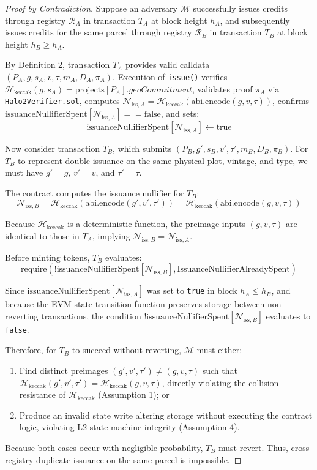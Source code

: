 \documentclass[preprint,12pt]{elsarticle}
\begin{document}
\begin{proof}[Proof by Contradiction] Suppose an adversary $\mathcal{M}$ successfully issues credits through registry $\mathcal{R}_A$ in transaction $T_A$ at block height $h_A$, and subsequently issues credits for the same parcel through registry $\mathcal{R}_B$ in transaction $T_B$ at block height $h_B \ge h_A$.

By Definition 2, transaction $T_A$ provides valid calldata $(P_A, g, s_A, v, \tau, m_A, D_A, \pi_A)$. Execution of \texttt{issue()} verifies $\mathcal{H}_{\text{keccak}}(g, s_A) = \text{projects}[P_A].geoCommitment$, validates proof $\pi_A$ via \texttt{Halo2Verifier.sol}, computes $\mathcal{N}_{\text{iss}, A} = \mathcal{H}_{\text{keccak}}(\text{abi.encode}(g, v, \tau))$, confirms $\text{issuanceNullifierSpent}[\mathcal{N}_{\text{iss}, A}] == \text{false}$, and sets:
$$\text{issuanceNullifierSpent}[\mathcal{N}_{\text{iss}, A}] \leftarrow \text{true}$$

Now consider transaction $T_B$, which submits $(P_B, g', s_B, v', \tau', m_B, D_B, \pi_B)$. For $T_B$ to represent double-issuance on the same physical plot, vintage, and type, we must have $g' = g$, $v' = v$, and $\tau' = \tau$. 

The contract computes the issuance nullifier for $T_B$:
$$\mathcal{N}_{\text{iss}, B} = \mathcal{H}_{\text{keccak}}(\text{abi.encode}(g', v', \tau')) = \mathcal{H}_{\text{keccak}}(\text{abi.encode}(g, v, \tau))$$

Because $\mathcal{H}_{\text{keccak}}$ is a deterministic function, the preimage inputs $(g, v, \tau)$ are identical to those in $T_A$, implying $\mathcal{N}_{\text{iss}, B} = \mathcal{N}_{\text{iss}, A}$.

Before minting tokens, $T_B$ evaluates:
$$\text{require}(!\text{issuanceNullifierSpent}[\mathcal{N}_{\text{iss}, B}], \text{IssuanceNullifierAlreadySpent})$$

Since $\text{issuanceNullifierSpent}[\mathcal{N}_{\text{iss}, A}]$ was set to \texttt{true} in block $h_A \le h_B$, and because the EVM state transition function preserves storage between non-reverting transactions, the condition $!\text{issuanceNullifierSpent}[\mathcal{N}_{\text{iss}, B}]$ evaluates to \texttt{false}. 

Therefore, for $T_B$ to succeed without reverting, $\mathcal{M}$ must either:
\begin{enumerate}
\item Find distinct preimages $(g', v', \tau') \neq (g, v, \tau)$ such that $\mathcal{H}_{\text{keccak}}(g', v', \tau') = \mathcal{H}_{\text{keccak}}(g, v, \tau)$, directly violating the collision resistance of $\mathcal{H}_{\text{keccak}}$ (Assumption 1); or
\item Produce an invalid state write altering storage without executing the contract logic, violating L2 state machine integrity (Assumption 4).
\end{enumerate}

Because both cases occur with negligible probability, $T_B$ must revert. Thus, cross-registry duplicate issuance on the same parcel is impossible. \end{proof}
\end{document}
